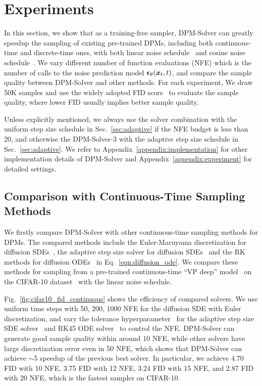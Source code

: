 \section{Experiments}
\label{sec:experiments}
In this section, we show that as a training-free sampler, DPM-Solver can greatly speedup the sampling of existing pre-trained DPMs, including both continuous-time and discrete-time ones, with both linear noise schedule~\citep{ho2020denoising,song2020denoising} and cosine noise schedule~\citep{nichol2021improved}. We vary different number of function evaluations (NFE) which is the number of calls to the noise prediction model $\bm{\epsilon}_\theta(\bm{x}_t,t)$, and compare the sample quality between DPM-Solver and other methods. For each experiment, We draw 50K samples and use the widely adopted FID score~\citep{heusel2017gans} to evaluate the sample quality, where lower FID usually implies better sample quality.

Unless explicitly mentioned, we always use the solver combination with the uniform step size schedule in Sec.~\ref{sec:adaptive} if the NFE budget is less than 20, and otherwise the DPM-Solver-3 with the adaptive step size schedule in Sec.~\ref{sec:adaptive}. We refer to Appendix~\ref{appendix:implementation} for other implementation details of DPM-Solver and Appendix~\ref{appendix:experiment} for detailed settings.

\subsection{Comparison with Continuous-Time Sampling Methods}
\label{sec:exp_continuous}
We firstly compare DPM-Solver with other continuous-time sampling methods for DPMs. The compared methods include the Euler-Maruyama discretization for diffusion SDEs~\citep{song2020score}, the adaptive step size solver for diffusion SDEs~\citep{jolicoeur2021gotta} and the RK methods for diffusion ODEs~\citep{song2020score,dormand1980family} in Eq.~\eqref{eqn:diffusion_ode}. We compare these methods for sampling from a pre-trained continuous-time ``VP deep'' model~\citep{song2020score} on the CIFAR-10 dataset~\citep{Krizhevsky09learningmultiple} with the linear noise schedule.


Fig.~\ref{fig:cifar10_fid_continuous} shows the efficiency of compared solvers. We use uniform time steps with 50, 200, 1000 NFE for the diffusion SDE with Euler discretization, and vary the tolerance hyperparameter~\citep{song2020score,jolicoeur2021gotta} for the adaptive step size SDE solver~\citep{jolicoeur2021gotta} and RK45 ODE solver~\citep{dormand1980family} to control the NFE. DPM-Solver can generate good sample quality within around 10 NFE, while other solvers have large discretization error even in 50 NFE, which shows that DPM-Solver can achieve $\sim$5 speedup of the previous best solver. In particular, we achieve 4.70 FID with 10 NFE, 3.75 FID with 12 NFE, 3.24 FID with 15 NFE, and 2.87 FID with 20 NFE, which is the fastest sampler on CIFAR-10.


